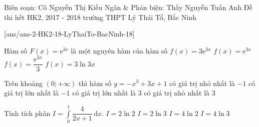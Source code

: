 
\begin{name}
{Biên soạn: Cô Nguyễn Thị Kiều Ngân \& Phản biện: Thầy Nguyễn Tuấn Anh}
{Đề thi hết HK2, 2017 - 2018 trường THPT Lý Thái Tổ, Bắc Ninh}
\end{name}
\setcounter{ex}{0}\setcounter{bt}{0}
[ans/ans-2-HK2-18-LyThaiTo-BacNinh-18]

\begin{ex}%
	Hàm số $F(x)= \mathrm{e}^{3x}$ là một nguyên hàm của hàm số
	\choice
	{\True $f(x)=3\mathrm{e}^{3x}$}
	{$f(x)=\mathrm{e}^{3x}$}
	{$f(x)=\dfrac{\mathrm{e}^{3x}}{3}$}
	{$f(x)=3\ln{3x}$}
\end{ex}

\begin{ex}%
	Trên khoảng $(0;+\infty)$ thì hàm số $y=-x^3+3x+1$
	\choice
	{có giá trị nhỏ nhất là $-1$}
	{có giá trị lớn nhất là $-1$}
	{\True có giá trị lớn nhất là $3$}
	{có giá trị nhỏ nhất là $3$}
\end{ex} 

\begin{ex}%
	Tính tích phân $I=\displaystyle \int \limits_0^1 \dfrac{4}{2x+1} \mathrm{\,d}x$.
	\choice
	{$I=2\ln 2$}
	{\True $I=2\ln 3$}
	{$I=4\ln 2$}
	{$I=4\ln 3$}
\end{ex} 

